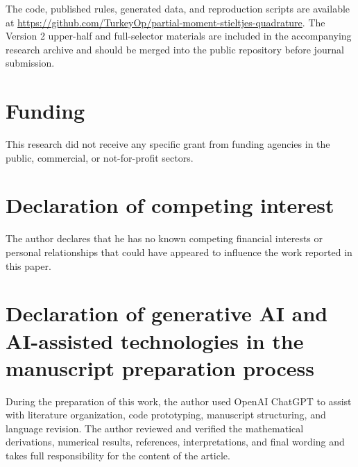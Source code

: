 \documentclass[preprint,12pt]{elsarticle}
\theoremstyle{remark}
\begin{document}
The code, published rules, generated data, and reproduction scripts are
available at
\url{https://github.com/TurkeyOp/partial-moment-stieltjes-quadrature}.
The Version 2 upper-half and full-selector materials are included in the
accompanying research archive and should be merged into the public
repository before journal submission.

\section*{Funding}

This research did not receive any specific grant from funding agencies
in the public, commercial, or not-for-profit sectors.

\section*{Declaration of competing interest}

The author declares that he has no known competing financial interests
or personal relationships that could have appeared to influence the
work reported in this paper.

\section*{Declaration of generative AI and AI-assisted technologies in
the manuscript preparation process}

During the preparation of this work, the author used OpenAI ChatGPT to
assist with literature organization, code prototyping, manuscript
structuring, and language revision. The author reviewed and verified
the mathematical derivations, numerical results, references,
interpretations, and final wording and takes full responsibility for
the content of the article.
\end{document}
